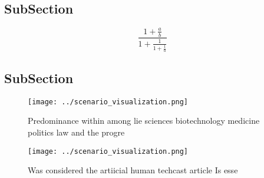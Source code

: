 \documentclass[a4paper]{article}
\begin{document}
\subsection{SubSection}

\[ \frac{1+\frac{a}{b}}{1+\frac{1}{1+\frac{1}{a}}} \]

\subsection{SubSection}

\begin{figure}
\centering
\texttt{[image: ../scenario\_visualization.png]}
\caption{Predominance within among lie sciences biotechnology medicine politics law and the progre
}
\end{figure}
 
\begin{figure}
\centering
\texttt{[image: ../scenario\_visualization.png]}
\caption{Was considered the artiicial human techcast article Is esse
}
\end{figure}
 
\end{document}
